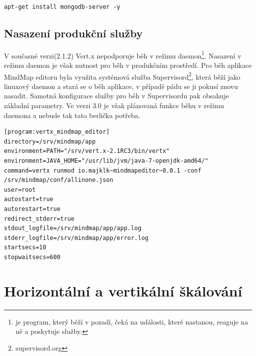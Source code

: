 \begin{lstlisting}
apt-get install mongodb-server -y
\end{lstlisting}

\subsection{Nasazení produkční služby}\label{sub:service}

V současné verzi(2.1.2) Vert.x nepodporuje běh v režimu daemon\footnote{je program, který běží v pozadí, čeká na události, které nastanou, reaguje na ně a poskytuje služby.}. Nasazení v režimu daemon je však nutnost pro běh v produkčním prostředí. Pro běh aplikace MindMap editoru byla využita systémová služba Supervisord\footnote{supervisord.org}, která běží jako linuxový daemon a stará se o běh aplikace, v případě pádu se ji pokusí znovu nasadit. Samotná konfigurace služby pro běh v Supervisordu pak obsahuje základní parametry. Ve verzi 3.0 je však plánovaná funkce běhu v režimu daemona a nebude tak tato berlička potřeba.

\begin{lstlisting}
[program:vertx_mindmap_editor]
directory=/srv/mindmap/app
environment=PATH="/srv/vert.x-2.1RC3/bin/vertx"
environment=JAVA_HOME="/usr/lib/jvm/java-7-openjdk-amd64/"
command=vertx runmod io.majklk~mindmapeditor~0.0.1 -conf /srv/mindmap/conf/allinone.json
user=root
autostart=true
autorestart=true
redirect_stderr=true
stdout_logfile=/srv/mindmap/app/app.log
stderr_logfile=/srv/mindmap/app/error.log
startsecs=10
stopwaitsecs=600
\end{lstlisting}


\section{Horizontální a vertikální škálování}\label{sub:Scaling}

